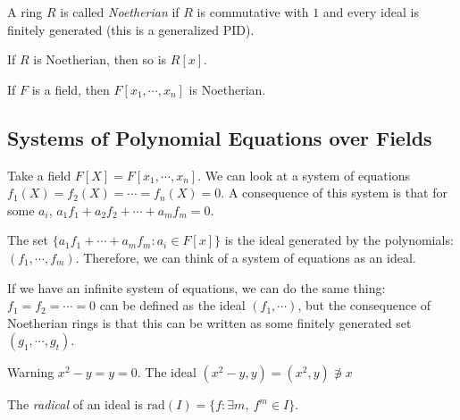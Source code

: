\documentclass[a4paper,twoside,master.tex]{subfiles}
\begin{document}
\begin{definition}
    A ring $ R $ is called \textit{Noetherian} if $ R $ is commutative with $ 1 $ and every ideal is finitely generated (this is a generalized PID).
\end{definition}

\begin{theorem}
    If $ R $ is Noetherian, then so is $ R[x] $.
\end{theorem}
\begin{corollary}
    If $ F $ is a field, then $ F[x_1, \cdots, x_n] $ is Noetherian.
\end{corollary}

\subsection{Systems of Polynomial Equations over Fields}
\label{sub:systems_of_polynomial_equations_over_fields}

Take a field $ F[X] = F[x_1, \cdots, x_n] $. We can look at a system of equations $ f_1(X) = f_2(X) = \cdots = f_n(X) = 0 $. A consequence of this system is that for some $ a_i $, $ a_1 f_1 + a_2 f_2 + \cdots + a_m f_m = 0 $.

The set $ \{a_1 f_1 + \cdots + a_m f_m\colon a_i \in F[x]\} $ is the ideal generated by the polynomials: $ (f_1, \cdots, f_m) $. Therefore, we can think of a system of equations as an ideal.

If we have an infinite system of equations, we can do the same thing: $ f_1 = f_2 = \cdots = 0 $ can be defined as the ideal $ (f_1, \cdots) $, but the consequence of Noetherian rings is that this can be written as some finitely generated set $ (g_1, \cdots, g_t) $.

\begin{note}{Warning}
    $ x^2 - y = y = 0 $. The ideal $ (x^2 - y, y)= (x^2, y) \not\ni x $
\end{note}
\begin{definition}
    The \textit{radical} of an ideal is $ \text{rad}(I) = \{f\colon \exists m,\ f^m \in I\} $.
\end{definition}
\end{document}
